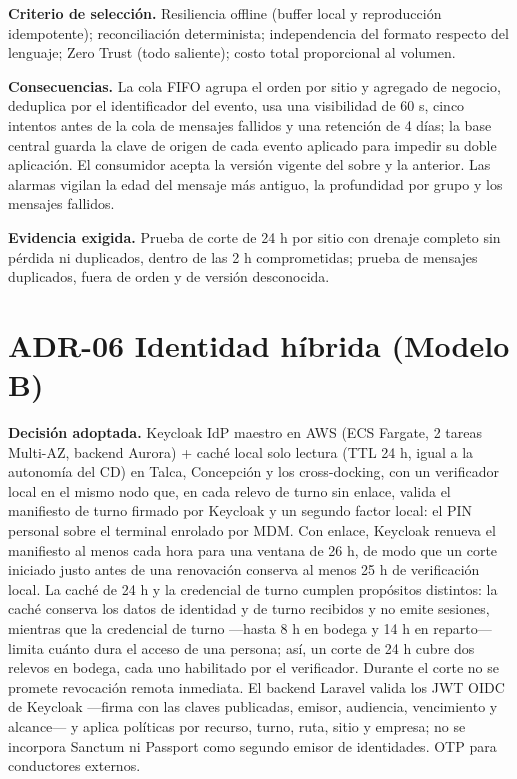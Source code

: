 \textbf{Criterio de selección.} Resiliencia offline (buffer local y reproducción idempotente); reconciliación determinista; independencia del formato respecto del lenguaje; Zero Trust (todo saliente); costo total proporcional al volumen.

\textbf{Consecuencias.} La cola FIFO agrupa el orden por sitio y agregado de negocio, deduplica por el identificador del evento, usa una visibilidad de 60 s, cinco intentos antes de la cola de mensajes fallidos y una retención de 4 días; la base central guarda la clave de origen de cada evento aplicado para impedir su doble aplicación. El consumidor acepta la versión vigente del sobre y la anterior. Las alarmas vigilan la edad del mensaje más antiguo, la profundidad por grupo y los mensajes fallidos.

\textbf{Evidencia exigida.} Prueba de corte de 24 h por sitio con drenaje completo sin pérdida ni duplicados, dentro de las 2 h comprometidas; prueba de mensajes duplicados, fuera de orden y de versión desconocida.

\section{ADR-06 \textperiodcentered{} Identidad híbrida (Modelo B)}
\label{sub:adr-06}

\textbf{Decisión adoptada.} Keycloak IdP maestro en AWS (ECS Fargate, 2 tareas Multi-AZ, backend Aurora) + caché local solo lectura (TTL 24 h, igual a la autonomía del CD) en Talca, Concepción y los cross-docking, con un verificador local en el mismo nodo que, en cada relevo de turno sin enlace, valida el manifiesto de turno firmado por Keycloak y un segundo factor local: el PIN personal sobre el terminal enrolado por MDM. Con enlace, Keycloak renueva el manifiesto al menos cada hora para una ventana de 26 h, de modo que un corte iniciado justo antes de una renovación conserva al menos 25 h de verificación local. La caché de 24 h y la credencial de turno cumplen propósitos distintos: la caché conserva los datos de identidad y de turno recibidos y no emite sesiones, mientras que la credencial de turno ---hasta 8 h en bodega y 14 h en reparto--- limita cuánto dura el acceso de una persona; así, un corte de 24 h cubre dos relevos en bodega, cada uno habilitado por el verificador. Durante el corte no se promete revocación remota inmediata. El backend Laravel valida los JWT OIDC de Keycloak ---firma con las claves publicadas, emisor, audiencia, vencimiento y alcance--- y aplica políticas por recurso, turno, ruta, sitio y empresa; no se incorpora Sanctum ni Passport como segundo emisor de identidades. OTP para conductores externos.

